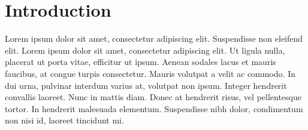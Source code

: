 \section{Introduction} \label{sec:introduction}
 Lorem ipsum dolor sit amet, consectetur adipiscing elit. Suspendisse non eleifend elit. Lorem ipsum dolor sit amet, consectetur adipiscing elit. Ut ligula nulla, placerat ut porta vitae, efficitur ut ipsum. Aenean sodales lacus et mauris faucibus, at congue turpis consectetur. Mauris volutpat a velit ac commodo. In dui urna, pulvinar interdum varius at, volutpat non ipsum. Integer hendrerit convallis laoreet. Nunc in mattis diam. Donec at hendrerit risus, vel pellentesque tortor. In hendrerit malesuada elementum. Suspendisse nibh dolor, condimentum non nisi id, laoreet tincidunt mi.
 
